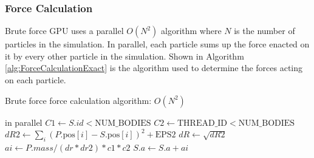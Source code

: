 \documentclass{thesis}
\begin{document}
\subsubsection{Force Calculation}
Brute force GPU uses a parallel $O(N^2)$ algorithm where $N$ is the number of particles in the simulation. In parallel, each particle sums up the force enacted on it by every other particle in the simulation. Shown in Algorithm \ref{alg:ForceCalculationExact} is the algorithm used to determine the forces acting on each particle.
\begin{algorithm}
    \label{alg:ForceCalculationExact}
    \caption{Brute force force calculation algorithm: $O(N^2)$}
    \begin{algorithmic}
         in parallel
                \State $C1 \gets S.id < \text{NUM\_BODIES}$
                \State $C2 \gets \text{THREAD\_ID} < \text{NUM\_BODIES}$
                \State $dR2 \gets \sum_i (P.\text{pos}[i] - S.\text{pos}[i])^2 + \text{EPS2}$
                \State $dR \gets \sqrt{dR2}$
                \State $ai \gets P.mass/(dr*dr2) * c1 * c2$
                \State $S.a \gets S.a + ai$ 
            \EndFor
        \EndFor
    \end{algorithmic}
\end{algorithm}
\end{document}
